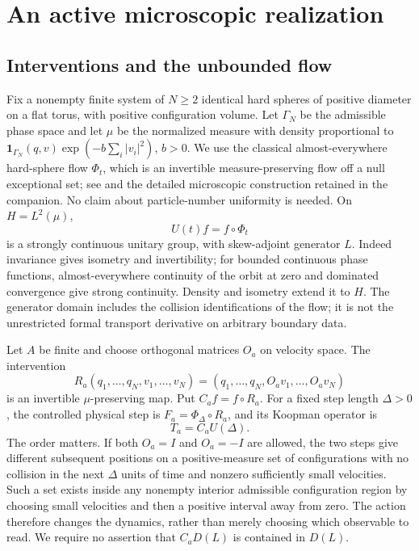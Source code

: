 \section{An active microscopic realization}\label{sec:v13-active}
\subsection{Interventions and the unbounded flow}
Fix a nonempty finite system of $N\ge2$ identical hard spheres of
positive diameter on a flat torus, with positive configuration volume.
Let $\Gamma_N$ be the admissible
phase space and let $\mu$ be the normalized measure with density
proportional to
$\mathbf1_{\Gamma_N}(q,v)\exp(-b\sum_i|v_i|^2)$, $b>0$.
We use the classical almost-everywhere hard-sphere flow $\Phi_t$,
which is an invertible measure-preserving flow off a null exceptional
set; see \cite{GallagherSaintRaymondTexier} and the detailed
microscopic construction retained in the companion. No claim about
particle-number uniformity is needed. On $H=L^2(\mu)$,
\[
 U(t)f=f\circ\Phi_t
\]
is a strongly continuous unitary group, with skew-adjoint generator
$L$. Indeed invariance gives isometry and invertibility; for bounded
continuous phase functions, almost-everywhere continuity of the orbit
at zero and dominated convergence give strong continuity. Density and
isometry extend it to $H$. The generator domain includes the collision
identifications of the flow; it is not the unrestricted formal
transport derivative on arbitrary boundary data.

Let $A$ be finite and choose orthogonal matrices $O_a$ on velocity
space. The intervention
\[
 R_a(q_1,\ldots,q_N,v_1,\ldots,v_N)
    =(q_1,\ldots,q_N,O_av_1,\ldots,O_av_N)
\]
is an invertible $\mu$-preserving map. Put $C_af=f\circ R_a$. For a
fixed step length $\Delta>0$, the controlled physical step is
$F_a=\Phi_\Delta\circ R_a$, and its Koopman operator is
\begin{equation}\label{eq:v13-kick}
 T_a=C_aU(\Delta).
\end{equation}
The order matters. If both $O_a=I$ and $O_a=-I$ are allowed, the two
steps give different subsequent positions on a positive-measure set
of configurations with no collision in the next $\Delta$ units of
time and nonzero sufficiently small velocities. Such a set exists
inside any nonempty interior admissible configuration region by
choosing small velocities and then a positive interval away from zero.
The action therefore changes the dynamics, rather than merely choosing
which observable to read. We require no assertion that $C_aD(L)$ is
contained in $D(L)$.

